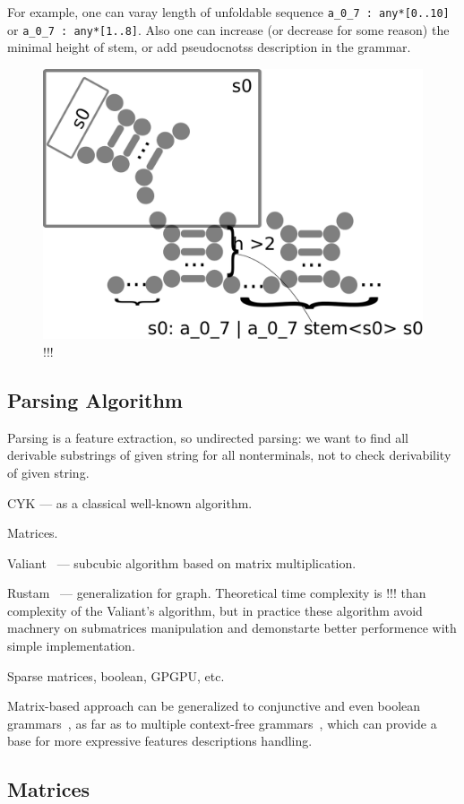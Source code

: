 \documentclass[a4paper,twoside]{article}
\begin{document}
For example, one can varay length of unfoldable sequence \verb|a_0_7 : any*[0..10]| or \verb|a_0_7 : any*[1..8]|.
Also one can increase (or decrease for some reason) the minimal height of stem, or add pseudocnotss description in the grammar.

\begin{figure}
\includegraphics[width=.5\textwidth]{figures/16sgrammar.pdf}
\caption{!!!}
\label{fig:ss}
\end{figure}

\subsection{Parsing Algorithm}

\noindent Parsing is a feature extraction, so undirected parsing: we want to find all derivable substrings of given string for all nonterminals, not to check derivability of given string.

CYK --- as a classical well-known algorithm.

Matrices.

Valiant~\cite{Valiant:1975:GCR:1739932.1740048} --- subcubic algorithm based on matrix multiplication.

Rustam~\cite{Azimov:2018:CPQ:3210259.3210264} --- generalization for graph. Theoretical time complexity is !!! than complexity of the Valiant's algorithm, but in practice these algorithm avoid machnery on submatrices manipulation and demonstarte better performence with simple implementation.

Sparse matrices, boolean, GPGPU, etc.

Matrix-based approach can be generalized to conjunctive and even boolean grammars~\cite{OKHOTIN2014101}, as far as to multiple context-free grammars~\cite{mcfgMatrices}, which can provide a base for more expressive features descriptions handling.

\subsection{Matrices}
\end{document}
